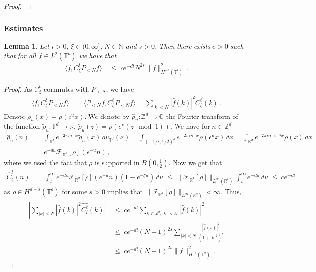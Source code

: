 \documentclass[11pt]{article}
\numberwithin{equation}{section}
\newtheorem{lemma}[theorem]{Lemma}
\theoremstyle{definition}
\renewcommand{\tilde}{\widetilde}          %
\renewcommand{\leq}{\;\leqslant\;}                   %
\newcommand{\C}{\mathbb{C}}
\newcommand{\R}{\mathbb{R}}
\newcommand{\Z}{\mathbb{Z}}
\newcommand{\N}{\mathbb{N}}
\def\T{\mathbb{T}}
\newcommand{\PN}{ {P_{< N}} }
\newcommand{\F}[1]{ { \hat{#1} } }
\begin{document}
\begin{proof}
\end{proof}


\subsubsection{Estimates}


\begin{lemma}\label{lem:C_PN}
Let $t>0$, $\xi \in (0,\infty]$, $N \in \N$ and $s > 0$. Then there exists $c > 0$ such that for all $f \in L^2(\T^d)$ we have that
\begin{align*}
\langle f, C_\xi^t P_{<N} f \rangle & \leq c e^{-dt} N^{2s}  \|f\|^2_{H^{-s}(\T^d)}\,.
\end{align*}
\end{lemma}
\begin{proof}
As $C_\xi^t$ commutes with $\PN$, we have
\begin{align*}
\langle f, C_\xi^t P_{<N} f \rangle &=  \langle \PN f, C_\xi^t \PN f \rangle =  \sum_{|k| < N} |\F{f} (k)|^2 \F{C_\xi^t}(k)\,.
\end{align*}
Denote $\rho_u(x) = \rho(e^u x)$. We denote by $\hat \rho_u: \Z^d \to \C$ the Fourier transform of the function $\tilde \rho_u: \T^d \to \R$, $\tilde \rho_u(z) = \rho(e^u(z \mod 1))$. We have for $n\in \mathbb{Z}^d$
\begin{align}\label{eq:rho_fourier}
   \hat \rho_u(n) &=\int_{\T^d} e^{-2 \pi i n \cdot x} \tilde \rho_u(x) \, dv_{\T^d}(x)  =\int_{(-1/2, 1/2)^d} e^{-2 \pi i n \cdot x} \rho(e^u x) \, dx =  \int_{\R^d} e^{-2 \pi i n \cdot e^{-u} x } \rho(x) \, dx \nonumber \\
   &= e^{-du} \mathcal{F}_{\R^d}[\rho](e^{-u}n) \,,
\end{align}
where we used the fact that $\rho$ is supported in $B(0,\frac 12)$. Now we get that 
\begin{align*}
\hat C_\xi^t(n) &= \int_t^\infty e^{-du} \mathcal{F}_{\R^d}[\rho] (e^{-u} n) (1-e^{-\xi u}) \, du  \leq \| \mathcal{F}_{\R^d}[\rho] \|_{L^\infty(\R^d)} \int_t^\infty e^{-du} \, du   \leq c e^{-dt}\,,
\end{align*}
as $\rho \in H^{d+s}(\T^d)$ for some $s >0$ implies that $\| \mathcal{F}_{\R^d}[\rho] \|_{L^\infty(\R^d)} < \infty$. Thus,
\begin{align*}
\left| \sum_{|k| < N} |\F{f} (k)|^2 \F{C_\xi^t}(k) \right| & \leq c e^{-dt} \sum_{k \in \Z^d, |k| < N} |\hat f(k)|^2   \\
& \leq c e^{-dt} (N+1)^{2s} \sum_{|k|<N} \frac{| \F{f}(k)|^2}{(1+|k|^2)^{s}} \\
&\leq c e^{-dt} (N+1)^{2s}  \|f\|^2_{H^{-s}(\T^d)}\,.
\end{align*}
\end{proof}
\end{document}
